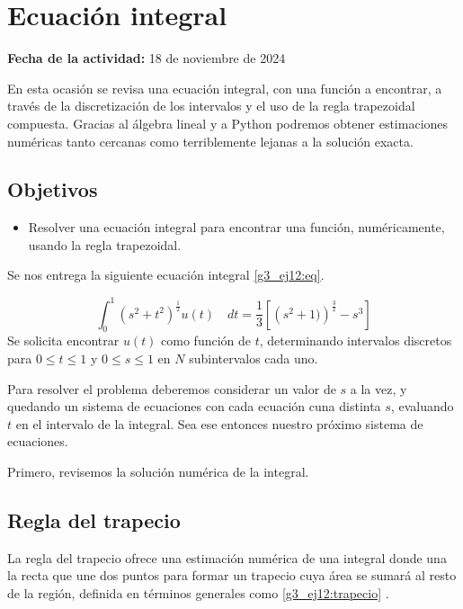 \documentclass[../portafolio.tex]{subfiles}
\begin{document}
\chapter{Ecuación integral}
\label{g3_ej12}
\hfill \textbf{Fecha de la actividad:} 18 de noviembre de 2024

\medskip

En esta ocasión se revisa una ecuación integral, con una función a encontrar, a través de la discretización de los intervalos y el uso de la regla trapezoidal compuesta. Gracias al álgebra lineal y a Python podremos obtener estimaciones numéricas tanto cercanas como terriblemente lejanas a la solución exacta.

\section*{Objetivos}
\begin{itemize}
\item Resolver una ecuación integral para encontrar una función, numéricamente, usando la regla trapezoidal.
\end{itemize}

Se nos entrega la siguiente ecuación integral \eqref{g3_ej12:eq}.

\begin{equation} \label{g3_ej12:eq}
\int_0^1 \left(s^2+t^2\right)^{\frac{1}{2}}u(t)\quad dt = \frac{1}{3}[\left(s^2+1)\right)^{\frac{3}{2}} - s^3]
\end{equation}
Se solicita encontrar $u(t)$ como función de $t$, determinando intervalos discretos para $0 \leq t \leq 1$ y $0 \leq s \leq 1$ en $N$ subintervalos cada uno.

Para resolver el problema deberemos considerar un valor de $s$ a la vez, y quedando un sistema de ecuaciones con cada ecuación cuna distinta $s$, evaluando $t$ en el intervalo de la integral. Sea ese entonces nuestro próximo sistema de ecuaciones.

Primero, revisemos la solución numérica de la integral.

\section{Regla del trapecio}
La regla del trapecio ofrece una estimación numérica de una integral donde una la recta que une dos puntos para formar un trapecio cuya área se sumará al resto de la región, definida en términos generales como \eqref{g3_ej12:trapecio} \citep{navarro2024int}.
\end{document}
